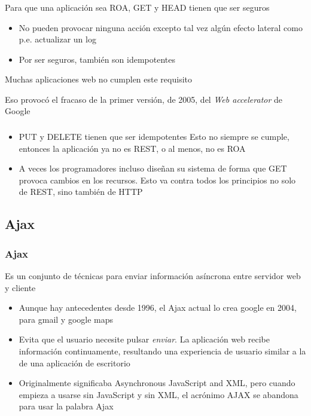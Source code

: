 \documentclass[ucs]{beamer}
\begin{document}
\begin{frame}[fragile]
\frametitle{}


Para que una aplicación sea ROA, GET y HEAD tienen que ser seguros 

\begin{itemize}
\item
No pueden provocar ninguna acción excepto tal vez algún efecto lateral
como p.e. actualizar un log
\item
Por ser seguros, también son idempotentes
\end{itemize}

Muchas aplicaciones web no cumplen este requisito

Eso provocó el fracaso de la primer versión, de 2005, del \emph{Web accelerator}
de Google

\end{frame}

\begin{frame}[fragile]
\frametitle{}
\begin{itemize}
\item

PUT y DELETE tienen que ser idempotentes
Esto no siempre se cumple, entonces la aplicación ya no es REST, o al menos, no es ROA
\item

A veces los programadores incluso diseñan su sistema de forma que GET provoca
cambios en los recursos. Esto va contra todos los principios no solo de REST,
sino también de  HTTP

\end{itemize}
\end{frame}




\subsection{Ajax}
\begin{frame}[fragile]
\frametitle{Ajax}

Es un conjunto de técnicas para enviar información asíncrona entre
servidor web y cliente

\begin{itemize}
\item
Aunque hay antecedentes desde 1996, el Ajax actual lo crea google en 2004, para gmail
y google maps
\item
Evita que el usuario necesite pulsar \emph{enviar}. La aplicación
web recibe información continuamente, resultando una experiencia de usuario similar
a la de una aplicación de escritorio
\item

Originalmente significaba Asynchronous JavaScript and XML, pero cuando
empieza a usarse sin JavaScript y sin XML, el acrónimo AJAX se abandona
para usar la palabra Ajax

\end{itemize}

\end{frame}
\end{document}
